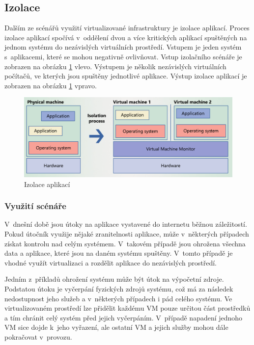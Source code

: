 \subsection{Izolace}
\label{chapter:virtualization:deployment:isolation}
Dalším ze scénářů využití virtualizované infrastruktury je izolace aplikací. Proces izolace aplikací spočívá v~oddělení dvou
a více kritických aplikací spuštěných na jednom systému do nezávislých virtuálních prostředí. Vstupem je jeden systém
s~aplikacemi, které se mohou negativně ovlivňovat. Vstup izolačního scénáře je zobrazen na obrázku \ref{figure:isolation} vlevo.
Výstupem je několik nezávislých virtuálních počítačů, ve kterých jsou spuštěny jednotlivé aplikace. Výstup izolace aplikací
je zobrazen na obrázku \ref{figure:isolation} vpravo.
\begin{figure}
    \centering    
    \label{figure:isolation}
    \includegraphics[scale=0.665]{assets/pdfs/isolation.pdf}
    \caption{Izolace aplikací}
\end{figure}
\subsubsection{Využití scénáře}
\label{chapter:virtualization:deployment:isolation:use}
V~dnešní době jsou útoky na aplikace vystavené do internetu běžnou záležitostí. Pokud útočník využije nějaké zranitelnosti 
aplikace, může v~některých případech získat kontrolu nad celým systémem. V~takovém případě jsou ohrožena všechna data a 
aplikace, které jsou na daném systému spuštěny. V~tomto případě je vhodné využít virtualizaci a rozdělit aplikace do nezávislých
prostředí.

Jedním z~příkladů ohrožení systému může být útok na výpočetní zdroje. Podstatou útoku je vyčerpání fyzických zdrojů systému,
což má za následek nedostupnost jeho služeb a v~některých případech i pád celého systému. Ve~   virtualizovaném prostředí lze
přidělit každému VM pouze určitou část prostředků a tím chránit celý systém před jejich vyčerpáním. V~případě napadení jednoho
VM sice dojde k~jeho vyřazení, ale ostatní VM a jejich služby mohou dále pokračovat v~provozu.
